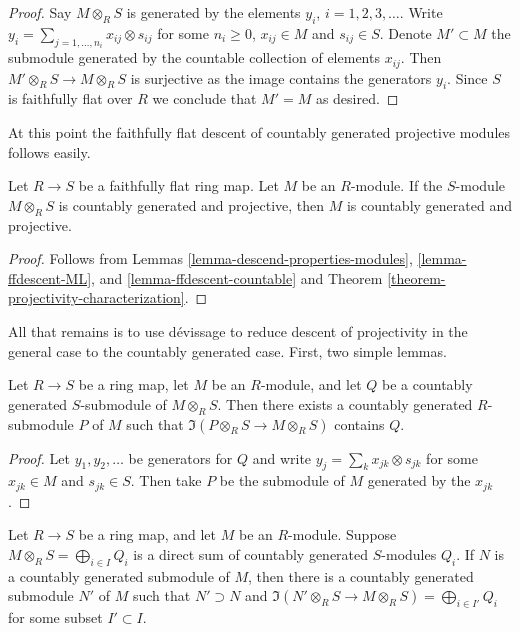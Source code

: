 \begin{proof}
Say $M \otimes_R S$ is generated by the elements
$y_i$, $i = 1, 2, 3, \ldots$. Write $y_i = \sum_{j = 1, \ldots, n_i}
x_{ij} \otimes s_{ij}$ for some $n_i \geq 0$, $x_{ij} \in M$
and $s_{ij} \in S$. Denote $M' \subset M$ the submodule generated
by the countable collection of elements $x_{ij}$. Then
$M' \otimes_R S \to M \otimes_R S$ is surjective as the
image contains the generators $y_i$. Since $S$ is faithfully flat
over $R$ we conclude that $M' = M$ as desired.
\end{proof}

\noindent
At this point the faithfully flat descent of countably generated projective
modules follows easily.

\begin{lemma}
\label{lemma-ffdescent-countable-projectivity}
Let $R \to S$ be a faithfully flat ring map.  Let $M$ be an $R$-module.
 If the $S$-module $M \otimes_R S$ is countably generated and projective,
then $M$ is countably generated and projective.
\end{lemma}

\begin{proof}
Follows from Lemmas \ref{lemma-descend-properties-modules},
\ref{lemma-ffdescent-ML}, and \ref{lemma-ffdescent-countable} and
Theorem \ref{theorem-projectivity-characterization}.
\end{proof}

\noindent
All that remains is to use d\'evissage to reduce descent of projectivity in the
general case to the countably generated case.  First, two simple lemmas.

\begin{lemma}
\label{lemma-lift-countably-generated-submodule}
Let $R \to S$ be a ring map, let $M$ be an $R$-module, and let $Q$ be a
countably generated $S$-submodule of $M \otimes_R S$.  Then there exists a
countably generated $R$-submodule $P$ of $M$ such that
$\Im(P \otimes_R S \to M \otimes_R S)$ contains $Q$.
\end{lemma}

\begin{proof}
Let $y_1, y_2, \ldots$ be generators for $Q$ and write $y_j = \sum_k x_{jk}
\otimes s_{jk}$ for some $x_{jk} \in M$ and $s_{jk} \in S$. Then take $P$ be
the submodule of $M$ generated by the $x_{jk}$.
\end{proof}

\begin{lemma}
\label{lemma-adapted-submodule}
Let $R \to S$ be a ring map, and let $M$ be an $R$-module.  Suppose $M
\otimes_R S = \bigoplus_{i \in I} Q_i$ is a direct sum of countably generated
$S$-modules $Q_i$.  If $N$ is a countably generated submodule of $M$, then
there is a countably generated submodule $N'$ of $M$ such that $N' \supset N$
and $\Im(N' \otimes_R S \to M \otimes_R S) =
\bigoplus_{i \in I'} Q_i$ for some subset $I' \subset I$.
\end{lemma}

